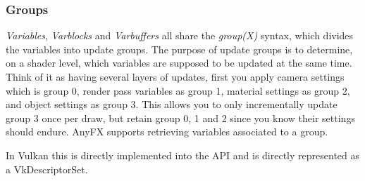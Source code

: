\documentclass{article}
\begin{document}
\subsubsection{Groups}
\textit{Variables}, \textit{Varblocks} and \textit{Varbuffers} all share the \textit{group(X)} syntax, which divides the variables into update groups. The purpose of update groups is to determine, on a shader level, which variables are supposed to be updated at the same time. Think of it as having several layers of updates, first you apply camera settings which is group 0, render pass variables as group 1, material settings as group 2, and object settings as group 3. This allows you to only incrementally update group 3 once per draw, but retain group 0, 1 and 2 since you know their settings should endure. AnyFX supports retrieving variables associated to a group.

In Vulkan this is directly implemented into the API and is directly represented as a VkDescriptorSet.
\end{document}
